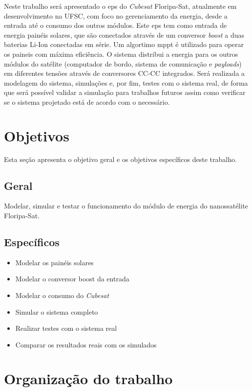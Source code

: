 Neste trabalho será apresentado o \gls{eps} do \textit{Cubesat} Floripa-Sat, atualmente em desenvolvimento na UFSC, com foco no gerenciamento da energia, desde a entrada até o consumo dos outros módulos. Este \gls{eps} tem como entrada de energia painéis solares, que são conectados através de um conversor \textit{boost} a duas baterias Li-Ion conectadas em série. Um algortimo \gls{mppt} é utilizado para operar os paineis com máxima eficiência. O sistema distribui a energia para os outros módulos do satélite (computador de bordo, sistema de comunicação e \textit{payloads}) em diferentes tensões através de conversores CC-CC integrados. Será realizada a modelagem do sistema, simulações e, por fim, testes com o sistema real, de forma que será possível validar a simulação para trabalhos futuros assim como verificar se o sistema projetado está de acordo com o necessário.

\section{Objetivos}

Esta seção apresenta o objetivo geral e os objetivos específicos deste trabalho.

\subsection{Geral}

Modelar, simular e testar o funcionamento do módulo de energia do nanossatélite Floripa-Sat.

\subsection{Específicos}
\begin{itemize}
\item Modelar os painéis solares
\item Modelar o conversor boost da entrada
\item Modelar o consumo do \textit{Cubesat}
\item Simular o sistema completo
\item Realizar testes com o sistema real
\item Comparar os resultados reais com os simulados
\end{itemize}

\section{Organização do trabalho}

